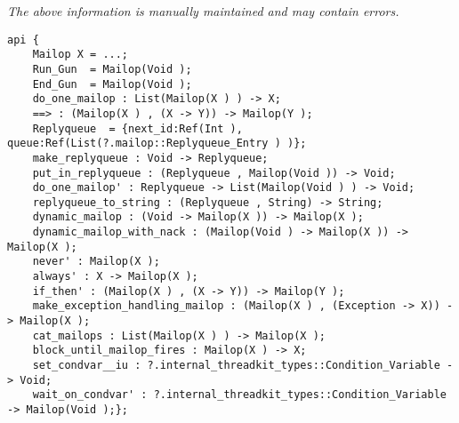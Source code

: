 \label{pkg:mailop}

{\tiny \it The above information is manually maintained and may contain errors.}
\begin{verbatim}
api {
    Mailop X = ...;
    Run_Gun  = Mailop(Void );
    End_Gun  = Mailop(Void );
    do_one_mailop : List(Mailop(X ) ) -> X;
    ==> : (Mailop(X ) , (X -> Y)) -> Mailop(Y );
    Replyqueue  = {next_id:Ref(Int ), queue:Ref(List(?.mailop::Replyqueue_Entry ) )};
    make_replyqueue : Void -> Replyqueue;
    put_in_replyqueue : (Replyqueue , Mailop(Void )) -> Void;
    do_one_mailop' : Replyqueue -> List(Mailop(Void ) ) -> Void;
    replyqueue_to_string : (Replyqueue , String) -> String;
    dynamic_mailop : (Void -> Mailop(X )) -> Mailop(X );
    dynamic_mailop_with_nack : (Mailop(Void ) -> Mailop(X )) -> Mailop(X );
    never' : Mailop(X );
    always' : X -> Mailop(X );
    if_then' : (Mailop(X ) , (X -> Y)) -> Mailop(Y );
    make_exception_handling_mailop : (Mailop(X ) , (Exception -> X)) -> Mailop(X );
    cat_mailops : List(Mailop(X ) ) -> Mailop(X );
    block_until_mailop_fires : Mailop(X ) -> X;
    set_condvar__iu : ?.internal_threadkit_types::Condition_Variable -> Void;
    wait_on_condvar' : ?.internal_threadkit_types::Condition_Variable -> Mailop(Void );};
\end{verbatim}

